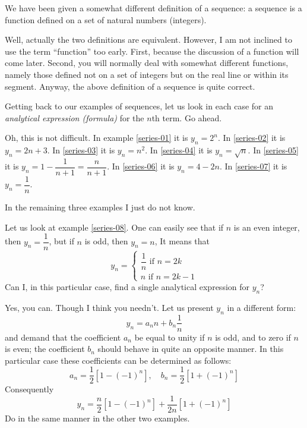 {\rdr We have been given a somewhat different definition of a sequence: a sequence is a function defined on a set of natural numbers (integers).

\athr Well, actually the two definitions are equivalent. However, I am not inclined to use the term ``function'' too early. First, because the discussion of a function will come later. Second, you will normally deal with somewhat
different functions, namely those defined not on a set of integers but on the real line or within its segment. Anyway, the above definition of a sequence is quite correct.

Getting back to our examples of sequences, let us look in each case for an \emph{analytical expression (formula)} for the $n$th term. Go ahead.

\rdr Oh, this is not difficult. In example \eqref{series-01} it is $y_{n}=2^{n}$. In \eqref{series-02} it is  $y_{n}=2n+3$. In \eqref{series-03} it is  $y_{n}= n^{2}$. In \eqref{series-04} it is  $y_{n}= \sqrt{n}$. In \eqref{series-05} it is  $y_{n}=1 - \dfrac{1}{n+1}= \dfrac{n}{n+1}$. In \eqref{series-06} it is  $y_{n}=4- 2n$. In \eqref{series-07} it is  $y_{n}= \dfrac{1}{n}$.

In the remaining three examples I just do not know. 

\athr Let us look at example \eqref{series-08}. One can easily see that if $n$ is an even integer, then $y_{n}=\dfrac{1}{n}$, but if $n$ is odd, then $y_{n} = n$, It means that 
\begin{equation*}%
y_{n}= 
\begin{cases}
\dfrac{1}{n} \,\, \text{if} \,\, n=2k \\
n  \,\, \text{if} \,\, n= 2k-1
\end{cases}
\end{equation*}
\rdr Can I, in this particular case, find a single analytical expression for $y_{n}$?

\athr Yes, you can. Though I think you needn't. Let us present $y_{n}$ in a different form:
\begin{equation*}%
y_{n} = a_{n} n + b_{n} \frac{1}{n}
\end{equation*}
and demand that the coefficient $a_{n}$ be equal to unity if $n$ is odd, and to zero if $n$ is even; the coefficient $b_{n}$ should behave in quite an opposite manner. In this particular case these coefficients can be determined as follows:
\begin{equation*}%
a_{n}  = \frac{1}{2} \left[1 - (-1)^{n} \right], \quad b_{n}  =  \frac{1}{2} \left[1 + (-1)^{n} \right] 
\end{equation*}
Consequently 
\begin{equation*}%
y_{n}  = \frac{n}{2} \left[1 - (-1)^{n} \right]+  \frac{1}{2n} \left[1 + (-1)^{n} \right] 
\end{equation*}
Do in the same manner in the other two examples. 

}
